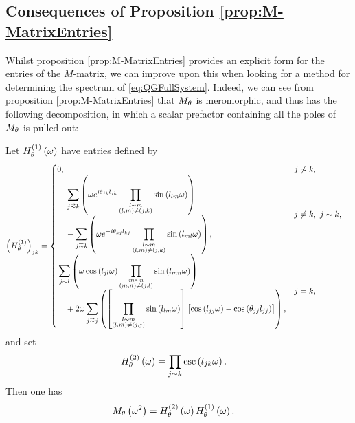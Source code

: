 \subsection{Consequences of Proposition \ref{prop:M-MatrixEntries}} \label{ssec:MMatrixConsequences}
Whilst proposition \ref{prop:M-MatrixEntries} provides an explicit form for the entries of the $M$-matrix, we can improve upon this when looking for a method for determining the spectrum of \eqref{eq:QGFullSystem}.
Indeed, we can see from proposition \ref{prop:M-MatrixEntries} that $M_\theta$ is meromorphic, and thus has the following decomposition, in which a scalar prefactor containing all the poles of $M_\theta$ is pulled out:
\begin{cory} \label{cory:M-MatrixEntriesNoPoles}
	Let $H^{(1)}_\theta\left( \omega \right)$ have entries defined by
	\begin{align*}
		\bracs{H^{(1)}_\qm}_{jk} &= 
		\begin{cases}
			\!\begin{aligned}
				&0,
			\end{aligned}			
			& j \not\con k, \\
			\!\begin{aligned}
				&-\sum_{j\conLeft k} \bracs{ \omega e^{i\qm_{jk}l_{jk}} \prod_{\substack{ l\con m \\ \bracs{l,m} \neq \bracs{j,k} }}\sin\bracs{l_{lm}\omega} }
				\\ &\quad - \sum_{j\conRight k} \bracs{ \omega e^{-i\qm_{kj}l_{kj}} \prod_{\substack{l\con m \\ \bracs{l,m} \neq \bracs{j,k} }}\sin\bracs{l_{ml}\omega} },
			\end{aligned}
			& j\neq k, \ j\con k, \\
			\!\begin{aligned}
				&\sum_{j\con l} \bracs{ \omega\cos\bracs{l_{jl}\omega}\prod_{\substack{ m\con n \\ \bracs{m,n}\neq\bracs{j,l} }}\sin\bracs{l_{mn}\omega} }
				\\ &\quad + 2\omega\sum_{j\conLeft j} \bracs{ \sqbracs{ \prod_{\substack{l\con m \\ \bracs{l,m}\neq\bracs{j,j} }}\sin\bracs{l_{lm}\omega} }\bigl[ \cos\bracs{l_{jj}\omega} - \cos\bracs{\qm_{jj}l_{jj}} \bigr] },
			\end{aligned}
			& j=k,
		\end{cases}
	\end{align*}
	and set
	\begin{align*}
		H^{(2)}_\theta\left( \omega \right) &= \prod_{j\sim k}\csc\left( l_{jk}\omega \right).
	\end{align*}
	Then one has
	\begin{align*}
		M_\theta\left( \omega^2 \right) &= H^{(2)}_\theta\left( \omega \right)H^{(1)}_\theta\left( \omega \right).
	\end{align*}
\end{cory}
